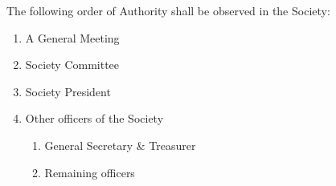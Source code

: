 \begin{clause}
	The following order of Authority shall be observed in the Society:
	\begin{enumerate}
		\item A General Meeting
		\item Society Committee
		\item Society President
		\item Other officers of the Society
		\begin{enumerate}
			\item General Secretary \& Treasurer
			\item Remaining officers
		\end{enumerate}
	\end{enumerate}
\end{clause}